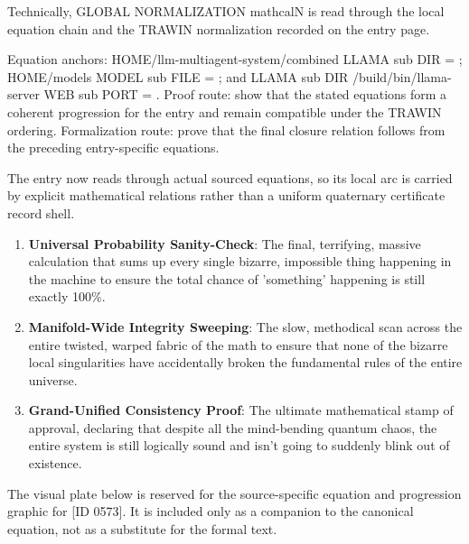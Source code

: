 Technically, GLOBAL NORMALIZATION mathcalN is read through the local equation chain and the TRAWIN normalization recorded on the entry page.

Equation anchors: HOME/llm-multiagent-system/combined LLAMA sub DIR = ; HOME/models MODEL sub FILE = ; and LLAMA sub DIR /build/bin/llama-server WEB sub PORT = . Proof route: show that the stated equations form a coherent progression for the entry and remain compatible under the TRAWIN ordering. Formalization route: prove that the final closure relation follows from the preceding entry-specific equations.

The entry now reads through actual sourced equations, so its local arc is carried by explicit mathematical relations rather than a uniform quaternary certificate record shell.
\endgroup

\begin{enumerate}[leftmargin=1.6em,itemsep=6pt,topsep=4pt]
\item \textbf{Universal Probability Sanity-Check}: The final, terrifying, massive calculation that sums up every single bizarre, impossible thing happening in the machine to ensure the total chance of 'something' happening is still exactly 100\%.
\item \textbf{Manifold-Wide Integrity Sweeping}: The slow, methodical scan across the entire twisted, warped fabric of the math to ensure that none of the bizarre local singularities have accidentally broken the fundamental rules of the entire universe.
\item \textbf{Grand-Unified Consistency Proof}: The ultimate mathematical stamp of approval, declaring that despite all the mind-bending quantum chaos, the entire system is still logically sound and isn't going to suddenly blink out of existence.
\end{enumerate}

\begingroup\footnotesize\sloppy
The visual plate below is reserved for the source-specific equation and progression graphic for [ID 0573]. It is included only as a companion to the canonical equation, not as a substitute for the formal text.
\par\endgroup
\ifTZPDarkEdition
{}
\fi

